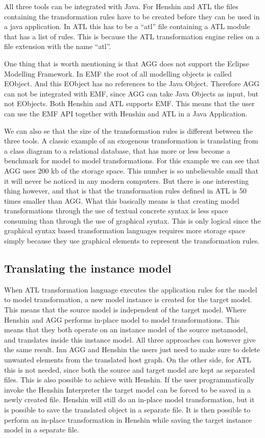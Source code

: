 \documentclass[pdftex,11pt,a4paper]{article}
\begin{document}
All three tools can be integrated with Java. For Henshin and ATL the files
containing the transformation rules have to be created before they can be used
in a java application. In ATL this has to be a ``atl'' file containing a ATL
module that has a list of rules. This is because the ATL transformation engine
relies on a file extension with the name ``atl''.

One thing that is worth mentioning is that AGG does not support the Eclipse
Modelling Framework. In EMF the root of all modelling objects is called
EObject. And this EObject has no references to the Java Object. Therefore AGG
can not be integrated with EMF, since AGG can take Java Objects as input,
but not EObjects. Both Henshin and ATL supports EMF. This means that the user
can use the EMF API together with Henshin and ATL in a Java Application.

We can also se that the size of the transformation rules is different
between the three tools. A classic example of an exogenous transformation is
translating from a class diagram to a relational database, that has more or less become a
benchmark for model to model transformations. For this example we can see that
AGG uses 200 kb of the storage space. This number is so unbelievable small
that it will never be noticed in any modern computers. But there is one
interesting thing however, and that is that the transformation rules defined in
ATL is 50 times smaller than AGG. What this basically means is that creating model
transformations through the use of textual concrete syntax is less space
consuming than through the use of graphical syntax. This is only logical since
the graphical syntax based transformation languages requires more storage
space simply because they use graphical elements to represent the transformation
rules.

\subsection{Translating the instance model}

When ATL transformation language executes the application rules for the model to
model transformation, a new model instance is created for the target model. This
means that the source model is independent of the target model. Where Henshin
and AGG performs in-place model to model transformations. This means that they
both operate on an instance model of the source metamodel, and translates
inside this instance model. All three approaches can however give the same
result. Inn AGG and Henshin the users just need to make sure to delete unwanted
elements from the translated host graph. On the other side, for ATL this is not
needed, since both the source and target model are kept as separated files. This
is also possible to achieve with Henshin. If the user programmatically invoke
the Henshin Interpreter the target model can be forced to be saved in a newly
created file. Henshin will still do an in-place model transformation, but it is
possible to save the translated object in a separate file. It is then possible
to perform an in-place transformation in Henshin while saving the target
instance model in a separate file. 
\end{document}
